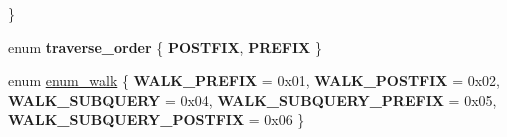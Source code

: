 \begin{DoxyCompactItemize}
 \}
\item 
\mbox{\label{classItem_ab90611975a34654134d0b82e75dc12f1}} 
enum {\bfseries traverse\+\_\+order} \{ {\bfseries P\+O\+S\+T\+F\+IX}, 
{\bfseries P\+R\+E\+F\+IX}
 \}
\item 
enum \mbox{\hyperlink{classItem_a4e68f315ba2a26543339e9f0efed3695}{enum\+\_\+walk}} \{ \newline
{\bfseries W\+A\+L\+K\+\_\+\+P\+R\+E\+F\+IX} = 0x01, 
{\bfseries W\+A\+L\+K\+\_\+\+P\+O\+S\+T\+F\+IX} = 0x02, 
{\bfseries W\+A\+L\+K\+\_\+\+S\+U\+B\+Q\+U\+E\+RY} = 0x04, 
{\bfseries W\+A\+L\+K\+\_\+\+S\+U\+B\+Q\+U\+E\+R\+Y\+\_\+\+P\+R\+E\+F\+IX} = 0x05, 
\newline
{\bfseries W\+A\+L\+K\+\_\+\+S\+U\+B\+Q\+U\+E\+R\+Y\+\_\+\+P\+O\+S\+T\+F\+IX} = 0x06
 \}
\end{DoxyCompactItemize}
